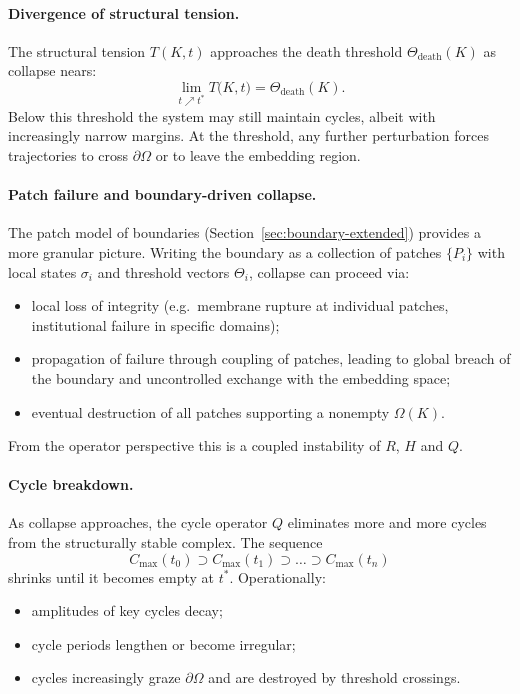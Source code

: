 \paragraph{Divergence of structural tension.}
The structural tension \(T(K,t)\) approaches the death threshold
\(\Theta_{\mathrm{death}}(K)\) as collapse nears:
\[
  \lim_{t\nearrow t^{\ast}} T\big(K,t\big)
    = \Theta_{\mathrm{death}}(K).
\]
Below this threshold the system may still maintain cycles, albeit with
increasingly narrow margins. At the threshold, any further perturbation
forces trajectories to cross \(\partial\Omega\) or to leave the embedding
region.

\paragraph{Patch failure and boundary-driven collapse.}
The patch model of boundaries
(Section~\ref{sec:boundary-extended}) provides a more granular picture.
Writing the boundary as a collection of patches \(\{P_i\}\) with local states
\(\sigma_i\) and threshold vectors \(\Theta_i\),
collapse can proceed via:
\begin{itemize}
  \item local loss of integrity (e.g.\ membrane rupture at individual
        patches, institutional failure in specific domains);
  \item propagation of failure through coupling of patches, leading to
        global breach of the boundary and uncontrolled exchange with the
        embedding space;
  \item eventual destruction of all patches supporting a nonempty
        \(\Omega(K)\).
\end{itemize}
From the operator perspective this is a coupled instability of \(R\),
\(H\) and \(Q\).

\paragraph{Cycle breakdown.}
As collapse approaches, the cycle operator \(Q\) eliminates more and more
cycles from the structurally stable complex. The sequence
\[
  C_{\max}(t_0)
  \supset C_{\max}(t_1)
  \supset \dots
  \supset C_{\max}(t_n)
\]
shrinks until it becomes empty at \(t^{\ast}\). Operationally:
\begin{itemize}
  \item amplitudes of key cycles decay;
  \item cycle periods lengthen or become irregular;
  \item cycles increasingly graze \(\partial\Omega\) and are destroyed by
        threshold crossings.
\end{itemize}

